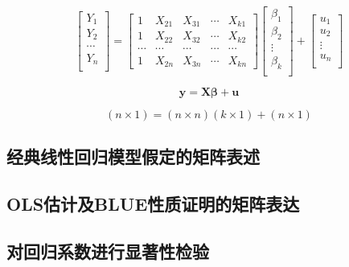 \documentclass[12pt,(landscape,a4paper),(portrait,a4paper)]{article}
\begin{document}
\begin{equation}
  \begin{bmatrix}
  Y_1 \\  Y_2 \\  \cdots \\  Y_n \\
  \end{bmatrix}  =
  \begin{bmatrix}
  1 &  X_{21} & X_{31} & \cdots &  X_{k1} \\
  1 &  X_{22} & X_{32} & \cdots &  X_{k2} \\
  \cdots &  \cdots & \cdots & \cdots &  \cdots \\
  1 &  X_{2n} & X_{3n} & \cdots &  X_{kn}
  \end{bmatrix}
  \begin{bmatrix}
  \beta_1 \\  \beta_2 \\  \vdots \\  \beta_k \\
  \end{bmatrix}+
  \begin{bmatrix}
  u_1 \\  u_2 \\  \vdots \\  u_n \\
  \end{bmatrix}
\label{eq:PRM-agbmat} 
\end{equation}

\begin{equation}
\mathbf{y} = \mathbf{X}\mathbf{\beta}+\mathbf{u}
\label{eq:PRM-matrix} 
\end{equation}

\begin{equation}
(n \times 1) = (n \times n) (k \times 1)+(n \times 1)
\end{equation}

\subsection{经典线性回归模型假定的矩阵表述}

\hypertarget{olsblue}{%
\subsection{OLS估计及BLUE性质证明的矩阵表达}\label{olsblue}}

\subsection{对回归系数进行显著性检验}
\end{document}
